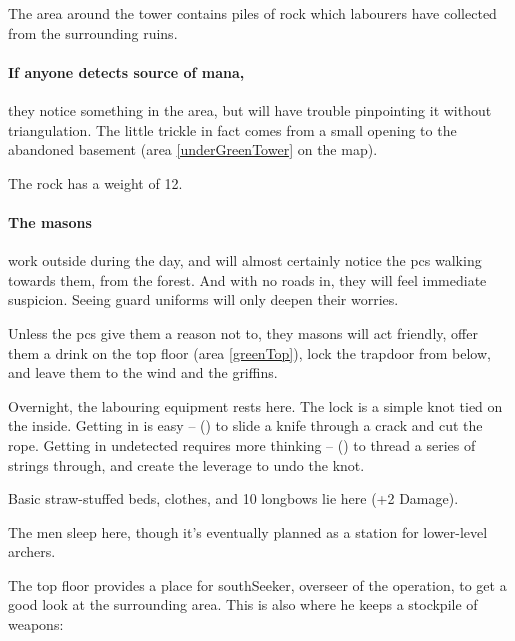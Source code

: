 
The area around the tower contains piles of rock which labourers have collected from the surrounding ruins.

\paragraph{If anyone detects source of mana,}
they notice something in the area, but will have trouble pinpointing it without triangulation.
The little trickle in fact comes from a small opening to the abandoned basement (area \ref{underGreenTower} on the map).

The rock has a \gls{weight} of 12.

\paragraph{The masons}
work outside during the day, and will almost certainly notice the \glspl{pc} walking towards them, from the forest.
And with no roads in, they will feel immediate suspicion.
Seeing \gls{guard} uniforms will only deepen their worries.

Unless the \glspl{pc} give them a reason not to, they masons will act friendly, offer them a drink on the top floor (area \ref{greenTop}), lock the trapdoor from below, and leave them to the wind and the griffins.%



Overnight, the labouring equipment rests here.
The lock is a simple knot tied on the inside.
Getting in is easy --  (\tn[6]) to slide a knife through a crack and cut the rope.
Getting in undetected requires more thinking --  (\tn[14]) to thread a series of strings through, and create the leverage to undo the knot.


Basic straw-stuffed beds, clothes, and 10 longbows lie here (+2 Damage).


The men sleep here, though it's eventually planned as a station for lower-level archers.


The top floor provides a place for \gls{southSeeker}, overseer of the operation, to get a good look at the surrounding area.
This is also where he keeps a stockpile of weapons:

